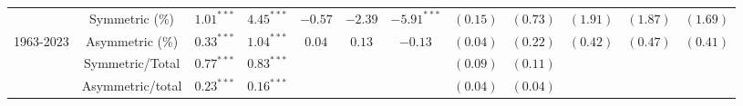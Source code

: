 \begin{tabular}{lccccccccccc}
   & Symmetric (\%) & $1.01^{***}$ & $4.45^{***}$ & $-0.57$ & $-2.39$ & $-5.91^{***}$ & $(0.15)$ & $(0.73)$ & $(1.91)$ & $(1.87)$ & $(1.69)$ \\ 
   \vspace{5pt}1963-2023 & Asymmetric (\%) & $0.33^{***}$ & $1.04^{***}$ & $0.04$ & $0.13$ & $-0.13$ & $(0.04)$ & $(0.22)$ & $(0.42)$ & $(0.47)$ & $(0.41)$ \\ 
   & Symmetric/Total & $0.77^{***}$ & $0.83^{***}$ &  &  &  & $(0.09)$ & $(0.11)$ &  &  &  \\ 
   & Asymmetric/total & $0.23^{***}$ & $0.16^{***}$ &  &  &  & $(0.04)$ & $(0.04)$ &  &  &  \\ 
   \bottomrule 
\end{tabular}
